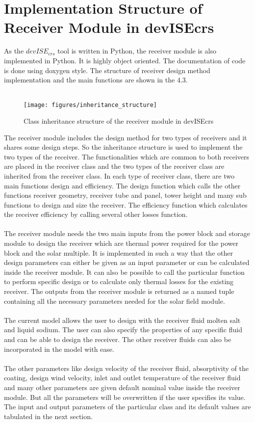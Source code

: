 \section{Implementation Structure of Receiver Module in devISEcrs}
As the $devISE_{crs}$ tool is written in Python, the receiver module is also implemented in Python. It is highly object oriented. The documentation of code is done using doxygen style. The structure of receiver design method implementation and the main functions are shown in the \figurename{ 4.3}. \\\\
\begin{figure}[h!]
	\texttt{[image: figures/inheritance\_structure]}
	\centering
	\caption{Class inheritance structure of the receiver module in devISEcrs}	
\end{figure}
The receiver module includes the design method for two types of receivers and it shares some design steps. So the inheritance structure is used to implement the two types of the receiver. The functionalities which are common to both receivers are placed in the receiver class and the two types of the receiver class are inherited from the receiver class. In each type of receiver class, there are two main functions design and efficiency. The design function which calls the other functions receiver geometry, receiver tube and panel, tower height and many sub functions to design and size the receiver. The efficiency function which calculates the receiver efficiency by calling several other losses function.\\\\
The receiver module needs the two main inputs from the power block and storage module to design the receiver which are thermal power required for the power block and the solar multiple. It is implemented in such a way that the other design parameters can either be given as an input parameter or can be calculated inside the receiver module. It can also be possible to call the particular function to perform specific design or to calculate only thermal losses for the existing receiver. The outputs from the receiver module is returned as a named tuple containing all the necessary parameters needed for the solar field module. \\\\
The current model allows the user to design with the receiver fluid molten salt and liquid sodium. The user can also specify the properties of any specific fluid and can be able to design the receiver. The other receiver fluids can also be incorporated in the model with ease. \\\\
The other parameters like design velocity of the receiver fluid, absorptivity of the coating, design wind velocity, inlet and outlet temperature of the receiver fluid and many other parameters are given default nominal value inside the receiver module. But all the parameters will be overwritten if the user specifies its value. The input and output parameters of the particular class and its default values are tabulated in the next section.

